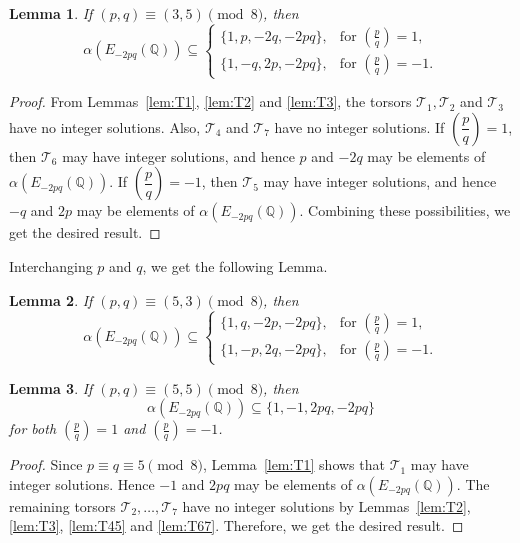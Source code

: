 \documentclass[12pt]{amsart}
\newcommand{\bbQ}{\mathbb{Q}}
\newcommand{\cT}{\mathcal{T}}
\newcommand{\legendre}[2]{\genfrac{(}{)}{}{}{#1}{#2}}
\numberwithin{equation}{section}
\newtheorem{lem}{Lemma}[section]
\theoremstyle{definition}
\begin{document}
\begin{lem}
\label{lem:alpha_case_4.2}
If $(p,q)\equiv (3,5)\pmod 8$, then
\[
\alpha\left(E_{-2pq}(\bbQ)\right)\subseteq
\begin{cases}
\{1,p,-2q,-2pq\},
& \text{for } \legendre{p}{q}=1,\\
\{1,-q,2p,-2pq\},
& \text{for } \legendre{p}{q}=-1.
\end{cases}
\]
\end{lem}

\begin{proof}
From Lemmas~\ref{lem:T1}, \ref{lem:T2} and \ref{lem:T3}, the torsors $\cT_{1},\cT_{2}$ and $\cT_{3}$ have no integer solutions. Also, $\cT_{4}$ and $\cT_{7}$ have no integer solutions. If $\left(\dfrac{p}{q}\right)=1$, then $\cT_{6}$ may have integer solutions, and hence $p$ and $-2q$ may be elements of $\alpha\left(E_{-2pq}(\bbQ)\right)$. If $\left(\dfrac{p}{q}\right)=-1$, then $\cT_{5}$ may have integer solutions, and hence $-q$ and $2p$ may be elements of $\alpha\left(E_{-2pq}(\bbQ)\right)$. Combining these possibilities, we get the desired result.
\end{proof}

Interchanging $p$ and $q$, we get the following Lemma. 

\begin{lem}
\label{lem:alpha_case_4.3}
If $(p,q)\equiv (5,3)\pmod 8$, then
\[
\alpha\left(E_{-2pq}(\bbQ)\right)\subseteq
\begin{cases}
\{1,q,-2p,-2pq\},
& \text{for } \legendre{p}{q}=1,\\
\{1,-p,2q,-2pq\},
& \text{for } \legendre{p}{q}=-1.
\end{cases}
\]
\end{lem}


\begin{lem}
\label{lem:alpha_case_4.4}
If $(p,q)\equiv (5,5)\pmod 8$, then
\[
\alpha\left(E_{-2pq}(\bbQ)\right)\subseteq \{1,-1,2pq,-2pq\}
\]
for both $\legendre{p}{q}=1$ and $\legendre{p}{q}=-1$.
\end{lem}

\begin{proof}
Since $p\equiv q\equiv 5\pmod 8$, Lemma~\ref{lem:T1} shows that $\cT_{1}$ may have integer solutions. Hence $-1$ and $2pq$ may be elements of $\alpha\left(E_{-2pq}(\bbQ)\right)$. The remaining torsors $\cT_{2},\ldots,\cT_{7}$ have no integer solutions by Lemmas~\ref{lem:T2}, \ref{lem:T3}, \ref{lem:T45} and \ref{lem:T67}. Therefore, we get the desired result.
\end{proof}
\end{document}
